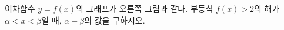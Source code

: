 \noindent\begin{minipage}[t]{0.58\linewidth}\vspace{0pt}\raggedright 이차함수 $y=f(x)$의 그래프가 오른쪽 그림과 같다. 부등식 $f(x)>2$의 해가 $\alpha<x<\beta$일 때, $\alpha-\beta$의 값을 구하시오.\end{minipage}\hfill\begin{minipage}[t]{0.4\linewidth}\vspace{0pt}\centering \resizebox{\ifdim\width>\linewidth\linewidth\else\width\fi}{!}{}\end{minipage}\par
